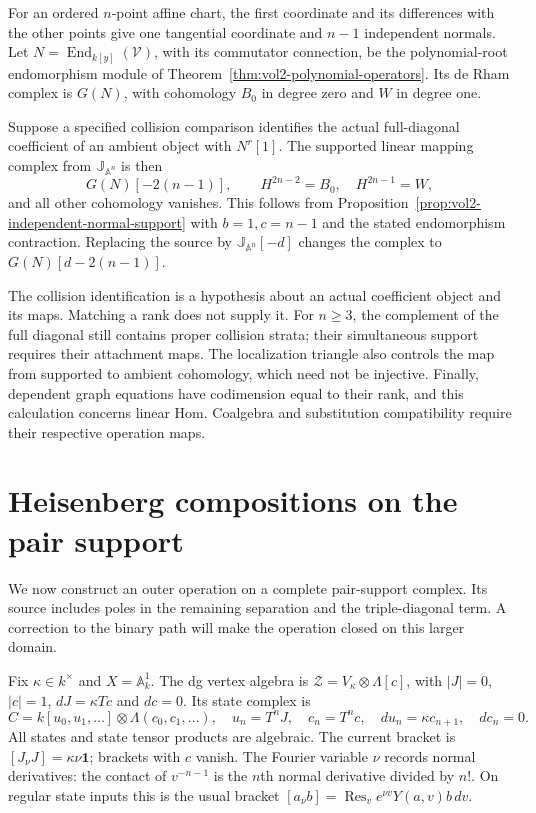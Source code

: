 For an ordered $n$-point affine chart, the first coordinate
and its differences with the other points give one tangential
coordinate and $n-1$ independent normals. Let
$N=\operatorname{End}_{k[y]}(\mathcal V)$, with its commutator
connection, be the polynomial-root endomorphism module of
Theorem~\ref{thm:vol2-polynomial-operators}. Its de Rham
complex is $G(N)$, with cohomology $B_0$ in degree zero and
$W$ in degree one.

Suppose a specified collision comparison identifies the actual
full-diagonal coefficient of an ambient object with $N^r[1]$.
The supported linear mapping complex from
$\mathbb J_{\mathbb A^n}$ is then
\begin{equation}\label{eq:vol2-full-diagonal-groups}
 G(N)[-2(n-1)],\qquad
 H^{2n-2}=B_0,\quad H^{2n-1}=W,
\end{equation}
and all other cohomology vanishes. This follows from
Proposition~\ref{prop:vol2-independent-normal-support} with
$b=1,c=n-1$ and the stated endomorphism contraction. Replacing
the source by $\mathbb J_{\mathbb A^n}[-d]$ changes the complex
to $G(N)[d-2(n-1)]$.

The collision identification is a hypothesis about an actual
coefficient object and its maps. Matching a rank does not supply
it. For $n\geq3$, the complement of the full diagonal still
contains proper collision strata; their simultaneous support
requires their attachment maps. The localization triangle also
controls the map from supported to ambient cohomology, which
need not be injective. Finally, dependent graph equations have
codimension equal to their rank, and this calculation concerns
linear Hom. Coalgebra and substitution compatibility require
their respective operation maps.

\section{Heisenberg compositions on the pair support}
\label{sec:vol2-supported-heisenberg}

We now construct an outer operation on a complete pair-support
complex. Its source includes poles in the remaining separation
and the triple-diagonal term. A correction to the binary path
will make the operation closed on this larger domain.

Fix $\kappa\in k^\times$ and $X=\mathbb A^1_k$. The dg vertex
algebra is $\mathcal Z=V_\kappa\otimes\Lambda[c]$, with
$|J|=0$, $|c|=1$, $dJ=\kappa Tc$ and $dc=0$.
Its state complex is
\begin{equation}\label{eq:vol2-supported-state-complex}
 C=k[u_0,u_1,\ldots]\otimes\Lambda(c_0,c_1,\ldots),
 \quad u_n=T^nJ,\quad c_n=T^nc,\quad
 du_n=\kappa c_{n+1},\quad dc_n=0.
\end{equation}
All states and state tensor products are algebraic. The current
bracket is $[J_\nu J]=\kappa\nu\mathbf1$; brackets with $c$
vanish. The Fourier variable $\nu$ records normal derivatives:
the contact of $v^{-n-1}$ is the $n$th normal derivative divided
by $n!$. On regular state inputs this is the usual bracket
$[a_\nu b]=\operatorname{Res}_v e^{\nu v}Y(a,v)b\,dv$.

